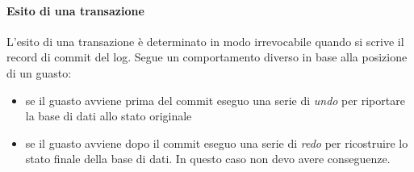 \paragraph{Esito di una transazione} L'esito di una transazione è determinato in modo irrevocabile quando si scrive il record di commit del log. Segue un comportamento diverso in base alla posizione di un guasto:
\begin{itemize}
	\item se il guasto avviene prima del commit eseguo una serie di \emph{undo} per riportare la base di dati allo stato originale
	\item se il guasto avviene dopo il commit eseguo una serie di \emph{redo} per ricostruire lo stato finale della base di dati. In questo caso non devo avere conseguenze.
\end{itemize}
\pagebreak

